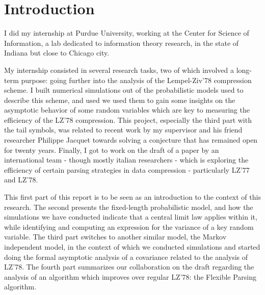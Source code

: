 
\versionCompil








{}


\tableofcontents

\section*{Introduction}

I did my internship at Purdue University, working
at the Center for Science of Information, a lab 
dedicated to information theory research, in the 
state of Indiana but close to Chicago city.

My internship consisted in several research tasks, 
two of which involved a long-term purpose: 
going further into the analysis of the Lempel-Ziv'78 
compression scheme. I built numerical simulations
out of the probabilistic models used to describe 
this scheme, and used we used them to gain some
insights on the asymptotic behavior of some 
random variables which are key to measuring the 
efficiency of the LZ'78 compression.
This project, especially the third part with 
the tail symbols, was related to recent work by my supervisor
and his friend researcher Philippe Jacquet
towards solving a conjecture that has remained 
open for twenty years. Finally, I got to work 
on the draft of a paper by an international team -  
though mostly italian researchers - which is exploring
the efficiency of certain parsing strategies in 
data compression - particularly LZ'77 and LZ'78.

This first part of this report is to be seen as 
an introduction to the context of this research.
The second presents the fixed-length probabilistic model,
and how the simulations we have conducted indicate 
that a central limit law applies within it, while identifying
and computing an expression for the variance of a key random variable.
The third part switches to another similar model, the 
Markov independent model, in the context of which 
we conducted simulations and started doing the formal asymptotic
analysis of a covariance related to the analysis of LZ'78.
The fourth part summarizes our collaboration on the draft
regarding the analysis of an algorithm which improves 
over regular LZ'78: the Flexible Parsing algorithm.



